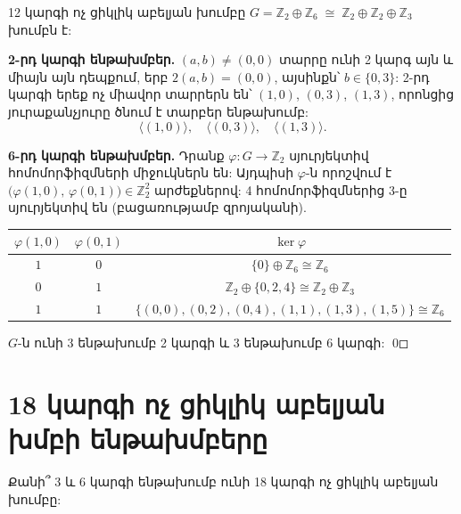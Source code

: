 \documentclass[12pt,a4paper]{article}
\newcommand{\armtext}{} %
\newenvironment{problem}{\begin{mdframed}[style=problemstyle]\armtext}{\end{mdframed}}
\newenvironment{sol}{\begin{mdframed}[style=solstyle]\armtext}{\end{mdframed}}
\newcommand{\Z}{\mathbb{Z}}
\newcommand{\gen}[1]{\langle #1 \rangle}
\begin{document}
\begin{sol}
12 կարգի ոչ ցիկլիկ աբելյան խումբը $G = \Z_2 \oplus \Z_6 \;\cong\; \Z_2 \oplus \Z_2 \oplus \Z_3$ խումբն է:

\medskip
\textbf{\color{SectCol}2-րդ կարգի ենթախմբեր.}\;
$(a,b) \neq (0,0)$ տարրը ունի 2 կարգ այն և միայն այն դեպքում, երբ $2(a,b)=(0,0)$, այսինքն՝
$b \in \{0,3\}$: 2-րդ կարգի երեք ոչ միավոր տարրերն են՝
$(1,0)$, $(0,3)$, $(1,3)$, որոնցից յուրաքանչյուրը ծնում է տարբեր ենթախումբ:
\[
  \gen{(1,0)},\quad \gen{(0,3)},\quad \gen{(1,3)}.
\]

\medskip
\textbf{\color{SectCol}6-րդ կարգի ենթախմբեր.}\;
Դրանք $\varphi\colon G \to \Z_2$ սյուրյեկտիվ հոմոմորֆիզմների միջուկներն են:
Այդպիսի $\varphi$-ն որոշվում է $\bigl(\varphi(1,0),\, \varphi(0,1)\bigr) \in \Z_2^2$ արժեքներով:
4 հոմոմորֆիզմներից 3-ը սյուրյեկտիվ են (բացառությամբ զրոյականի).

\smallskip
\begin{center}
\renewcommand{\arraystretch}{1.2}
\begin{tabular}{ccc}
  \toprule
  $\varphi(1,0)$ & $\varphi(0,1)$ & $\ker\varphi$ \\
  \midrule
  $1$ & $0$ & $\{0\}\oplus\Z_6 \cong \Z_6$ \\
  $0$ & $1$ & $\Z_2\oplus\{0,2,4\} \cong \Z_2\oplus\Z_3$ \\
  $1$ & $1$ & $\{(0,0),(0,2),(0,4),(1,1),(1,3),(1,5)\} \cong \Z_6$ \\
  \bottomrule
\end{tabular}
\end{center}

\medskip
$G$-ն ունի $\boxed{3}$ ենթախումբ 2 կարգի և $\boxed{3}$ ենթախումբ 6 կարգի: \qed
\end{sol}

\bigskip
\section{\armtext{18 կարգի ոչ ցիկլիկ աբելյան խմբի ենթախմբերը}}

\begin{problem}
Քանի՞ 3 և 6 կարգի ենթախումբ ունի 18 կարգի ոչ ցիկլիկ աբելյան խումբը:
\end{problem}
\end{document}

